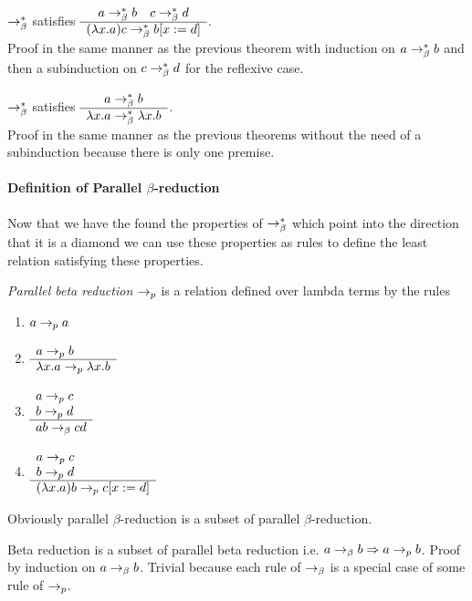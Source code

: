 \begin{theorem}
  $\to^*_\beta$ satisfies
  $\begin{array}{c} 
    a\to^*_\beta b \quad
    c \to^*_\beta d \\ \hline (\lambda x.a)c \to^*_\beta b[x:=d]\end{array}$.
  \\ Proof in the same manner as the previous theorem with induction on
  $a\to^*_\beta b$ and then a subinduction on $c \to^*_\beta d$ for the
  reflexive case.
\end{theorem}


\begin{theorem}
  $\to^*_\beta$ satisfies
  $\begin{array}{c} 
    a\to^*_\beta b \\ \hline \lambda x.a \to^*_\beta \lambda x.b\end{array}$.\\
Proof in the same manner as the previous theorems without the need of a
subinduction because there is only one premise.
\end{theorem}


\paragraph{Definition of Parallel $\beta$-reduction}

Now that we have the found the properties of $\to^*_\beta$ which point into
the direction that it is a diamond we can use these properties as rules to
define the least relation satisfying these properties.


\begin{definition}
\label{def:parallelbeta}
  \emph{Parallel beta reduction} $\to_{p}$ is a relation
  defined over lambda terms by the rules
  \begin{enumerate}
  \item $a \to_{p} a$
  \item $\begin{array}{l} a \to_{p} b \\ \hline \lambda x.a \to_{p} \lambda x.b\end{array}$
  \item $\begin{array}{l} a\to_{p} c \\ b \to_{p} d \\ \hline a b \to_\beta c d\end{array}$
  \item $\begin{array}{l} a\to_{p} c \\ b \to_{p} d \\ \hline (\lambda x.a) b \to_{p} c[x := d]\end{array}$
  \end{enumerate}
\end{definition}

Obviously parallel $\beta$-reduction is a subset of parallel
$\beta$-reduction.
\begin{lemma}
  Beta reduction is a subset of parallel beta reduction i.e.
  $a \to_\beta b \Rightarrow a \to_{p} b$.
  Proof by induction on $a \to_\beta b$. Trivial because each rule of $\to_\beta$
  is a special case of some rule of $\to_{p}$.
\end{lemma}



